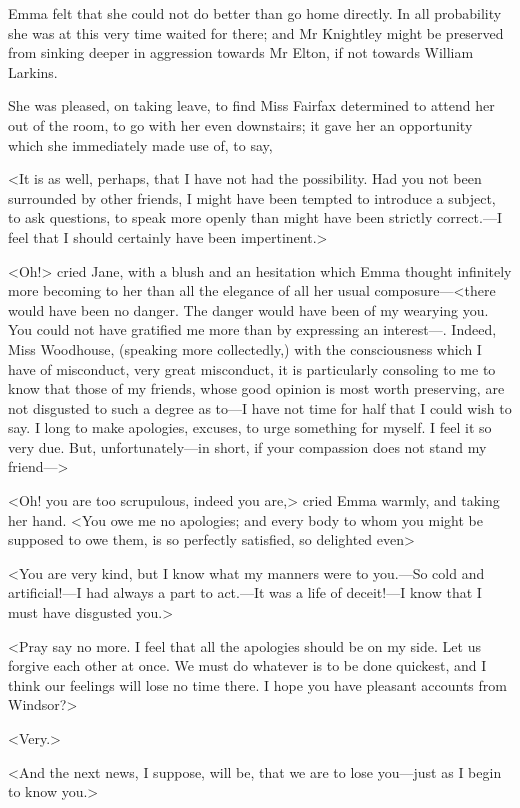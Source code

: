 Emma felt that she could not do better than go home directly. In all probability she was at this very time waited for there; and Mr Knightley might be preserved from sinking deeper in aggression towards Mr Elton, if not towards William Larkins.

She was pleased, on taking leave, to find Miss Fairfax determined to attend her out of the room, to go with her even downstairs; it gave her an opportunity which she immediately made use of, to say,

<It is as well, perhaps, that I have not had the possibility. Had you not been surrounded by other friends, I might have been tempted to introduce a subject, to ask questions, to speak more openly than might have been strictly correct.—I feel that I should certainly have been impertinent.>

<Oh!> cried Jane, with a blush and an hesitation which Emma thought infinitely more becoming to her than all the elegance of all her usual composure—<there would have been no danger. The danger would have been of my wearying you. You could not have gratified me more than by expressing an interest—. Indeed, Miss Woodhouse, (speaking more collectedly,) with the consciousness which I have of misconduct, very great misconduct, it is particularly consoling to me to know that those of my friends, whose good opinion is most worth preserving, are not disgusted to such a degree as to—I have not time for half that I could wish to say. I long to make apologies, excuses, to urge something for myself. I feel it so very due. But, unfortunately—in short, if your compassion does not stand my friend—>

<Oh! you are too scrupulous, indeed you are,> cried Emma warmly, and taking her hand. <You owe me no apologies; and every body to whom you might be supposed to owe them, is so perfectly satisfied, so delighted even\longdash>

<You are very kind, but I know what my manners were to you.—So cold and artificial!—I had always a part to act.—It was a life of deceit!—I know that I must have disgusted you.>

<Pray say no more. I feel that all the apologies should be on my side. Let us forgive each other at once. We must do whatever is to be done quickest, and I think our feelings will lose no time there. I hope you have pleasant accounts from Windsor?>

<Very.>

<And the next news, I suppose, will be, that we are to lose you—just as I begin to know you.>

